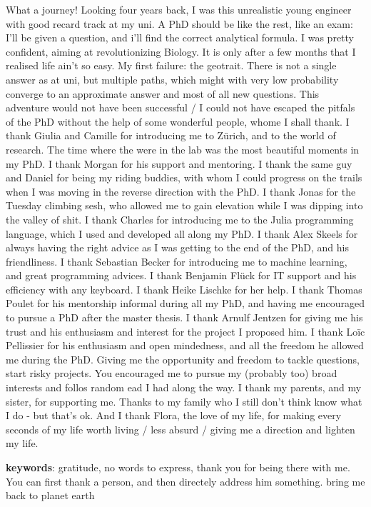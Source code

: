 %
\label{sec:acknowledgement}


What a journey! Looking four years back, I was this unrealistic young engineer with good recard track at my uni. A PhD should be like the rest, like an exam: I'll be given a question, and i'll find the correct analytical formula. 
%
I was pretty confident, aiming at revolutionizing Biology. It is only after a few months that I realised life ain't so easy.
% 
My first failure: the geotrait. There is not a single answer as at uni, but multiple paths, which might with very low probability converge to an approximate answer and most of all new questions.
% 
This adventure would not have been successful / I could not have escaped the pitfals of the PhD without the help of some wonderful people, whome I shall thank.
% 
I thank Giulia and Camille for introducing me to Zürich, and to the world of research. The time where the were in the lab was the most beautiful moments in my PhD.
% 
I thank Morgan for his support and mentoring. I thank the same guy and Daniel for being my riding buddies, with whom I could progress on the trails when I was moving in the reverse direction with the PhD.
% 
I thank Jonas for the Tuesday climbing sesh, who allowed me to gain elevation while I was dipping into the valley of shit.
% 
I thank Charles for introducing me to the Julia programming language, which I used and developed all along my PhD. 
% 
I thank Alex Skeels for always having the right advice as I was getting to the end of the PhD, and his friendliness.
% 
I thank Sebastian Becker for introducing me to machine learning, and great programming advices.
% 
I thank Benjamin Flück for IT support and his efficiency with any keyboard.
% 
I thank Heike Lischke for her help.
% 
I thank Thomas Poulet for his mentorship informal during all my PhD, and having me encouraged to pursue a PhD after the master thesis.
% 
I thank Arnulf Jentzen for giving me his trust and his enthusiasm and interest for the project I proposed him. 
% 
I thank Loïc Pellissier for his enthusiasm and open mindedness, and all the freedom he allowed me during the PhD. Giving me the opportunity and freedom to tackle questions, start risky projects. You encouraged me to pursue my (probably too) broad interests and follos random ead I had along the way.
% 
I thank my parents, and my sister, for supporting me.
Thanks to my family who I still don’t think know what I do - but that’s ok.
% 
And I thank Flora, the love of my life, for making every seconds of my life worth living / less absurd / giving me a direction and lighten my life.

\textbf{keywords}: gratitude, no words to express, thank you for being there with me. You can first thank a person, and then directely address him something. bring me back to planet earth


\begin{comment}
    some nice phrasing:
    I express my gratitude to xxx
    I am thankful to xxx
\end{comment}